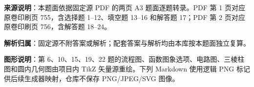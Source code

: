 


\begin{gknotice}
\textbf{来源说明}：本题面依据固定源 PDF 的两页 A3 题面逐题转录。PDF 第 1 页对应原卷印刷页 755，含选择题 1–12、填空题 13–16 和解答题 17；PDF 第 2 页对应原卷印刷页 756，含解答题 18–24。

\textbf{解析归属}：固定源不附答案或解析；配套答案与解析均由本库按本题面独立复算。

\textbf{图形说明}：第 6、10、15、19、22 题的流程图、函数图象选项、电路图、三棱柱图和圆内几何图由项目内 TikZ 矢量源重绘。下列 Markdown 使用逻辑 PNG 标记供后续生成器映射，仓库不保存 PNG/JPEG/SVG 图像。
\end{gknotice}


